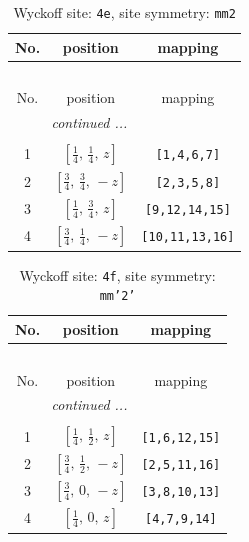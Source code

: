 \documentclass[fleqn,8pt]{jsarticle}
\begin{document}
\renewcommand{\arraystretch}{1.2}
\begin{longtable}{ccc}
\caption{Wyckoff site: {\tt 4e}, site symmetry: {\tt mm2}}
 \\
 \hline \hline
No. & position & mapping \\ \hline \endfirsthead

\multicolumn{2}{l}{\tablename\ \thetable{}} \\
 \hline \hline
No. & position & mapping \\ \hline \endhead

 \hline \hline
\multicolumn{2}{r}{\footnotesize\it continued ...} \\ \endfoot

 \hline \hline
\multicolumn{2}{r}{} \\ \endlastfoot

1 & $\left[ \frac{1}{4},\, \frac{1}{4},\, z \right]$ & {\tt [1,4,6,7]} \\ \hline
2 & $\left[ \frac{3}{4},\, \frac{3}{4},\, - z \right]$ & {\tt [2,3,5,8]} \\ \hline
3 & $\left[ \frac{1}{4},\, \frac{3}{4},\, z \right]$ & {\tt [9,12,14,15]} \\ \hline
4 & $\left[ \frac{3}{4},\, \frac{1}{4},\, - z \right]$ & {\tt [10,11,13,16]} \\
\end{longtable}
\renewcommand{\arraystretch}{1.2}
\begin{longtable}{ccc}
\caption{Wyckoff site: {\tt 4f}, site symmetry: {\tt mm'2'}}
 \\
 \hline \hline
No. & position & mapping \\ \hline \endfirsthead

\multicolumn{2}{l}{\tablename\ \thetable{}} \\
 \hline \hline
No. & position & mapping \\ \hline \endhead

 \hline \hline
\multicolumn{2}{r}{\footnotesize\it continued ...} \\ \endfoot

 \hline \hline
\multicolumn{2}{r}{} \\ \endlastfoot

1 & $\left[ \frac{1}{4},\, \frac{1}{2},\, z \right]$ & {\tt [1,6,12,15]} \\ \hline
2 & $\left[ \frac{3}{4},\, \frac{1}{2},\, - z \right]$ & {\tt [2,5,11,16]} \\ \hline
3 & $\left[ \frac{3}{4},\, 0,\, - z \right]$ & {\tt [3,8,10,13]} \\ \hline
4 & $\left[ \frac{1}{4},\, 0,\, z \right]$ & {\tt [4,7,9,14]} \\
\end{longtable}
\end{document}
